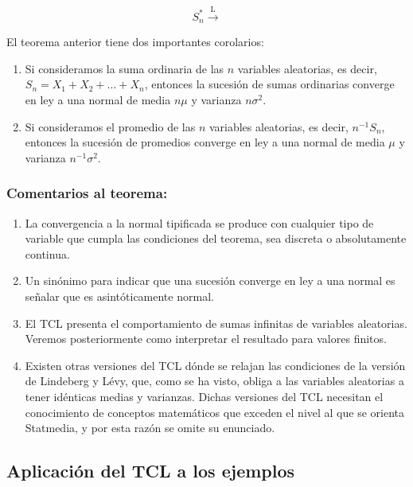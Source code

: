 \documentclass[
  a4paper,
  DIV=11,
  numbers=noendperiod]{scrreprt}
\providecommand{\tightlist}{%
  \setlength{\itemsep}{0pt}\setlength{\parskip}{0pt}}\usepackage{longtable,booktabs,array}
\begin{document}
\[
S_{n}^{*} \xrightarrow{\mathrm{L}}
\]

El teorema anterior tiene dos importantes corolarios:

\begin{enumerate}
\def\labelenumi{\arabic{enumi}.}
\item
  Si consideramos la suma ordinaria de las \(n\) variables aleatorias,
  es decir, \(S_{n}=X_{1}+X_{2}+\ldots+X_{n}\), entonces la sucesión de
  sumas ordinarias converge en ley a una normal de media \(n \mu\) y
  varianza \(n \sigma^{2}\).
\item
  Si consideramos el promedio de las \(n\) variables aleatorias, es
  decir, \(n^{-1} S_{n}\), entonces la sucesión de promedios converge en
  ley a una normal de media \(\mu\) y varianza \(n^{-1} \sigma^{2}\).
\end{enumerate}

\subsubsection{Comentarios al teorema:}\label{comentarios-al-teorema}

\begin{enumerate}
\def\labelenumi{\arabic{enumi}.}
\tightlist
\item
  La convergencia a la normal tipificada se produce con cualquier tipo
  de variable que cumpla las condiciones del teorema, sea discreta o
  absolutamente continua.
\item
  Un sinónimo para indicar que una sucesión converge en ley a una normal
  es señalar que es asintóticamente normal.
\item
  El TCL presenta el comportamiento de sumas infinitas de variables
  aleatorias. Veremos posteriormente como interpretar el resultado para
  valores finitos.
\item
  Existen otras versiones del TCL dónde se relajan las condiciones de la
  versión de Lindeberg y Lévy, que, como se ha visto, obliga a las
  variables aleatorias a tener idénticas medias y varianzas. Dichas
  versiones del TCL necesitan el conocimiento de conceptos matemáticos
  que exceden el nivel al que se orienta Statmedia, y por esta razón se
  omite su enunciado.
\end{enumerate}

\subsection{Aplicación del TCL a los
ejemplos}\label{aplicaciuxf3n-del-tcl-a-los-ejemplos}
\end{document}
